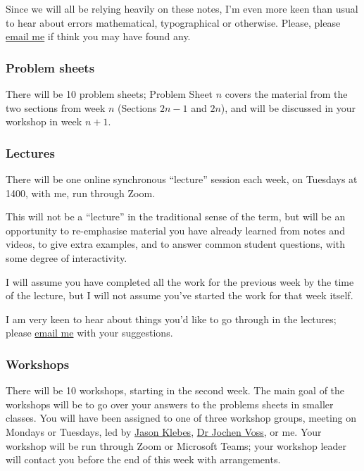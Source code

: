 \documentclass[
  a4paper,
]{article}
\theoremstyle{definition}
\theoremstyle{definition}
\theoremstyle{definition}
\theoremstyle{remark}
\begin{document}
Since we will all be relying heavily on these notes, I'm even more keen than usual to hear about errors mathematical, typographical or otherwise. Please, please \href{mailto:m.aldridge@leeds.ac.uk}{email me} if think you may have found any.

\hypertarget{problem-sheets}{%
\subsubsection*{Problem sheets}\label{problem-sheets}}

There will be 10 problem sheets; Problem Sheet \(n\) covers the material from the two sections from week \(n\) (Sections \(2n -1\) and \(2n\)), and will be discussed in your workshop in week \(n+1\).

\hypertarget{lectures}{%
\subsubsection*{Lectures}\label{lectures}}

There will be one online synchronous ``lecture'' session each week, on Tuesdays at 1400, with me, run through Zoom.

This will not be a ``lecture'' in the traditional sense of the term, but will be an opportunity to re-emphasise material you have already learned from notes and videos, to give extra examples, and to answer common student questions, with some degree of interactivity.

I will assume you have completed all the work for the previous week by the time of the lecture, but I will not assume you've started the work for that week itself.

I am very keen to hear about things you'd like to go through in the lectures; please \href{mailto:m.aldridge@leeds.ac.uk}{email me} with your suggestions.

\hypertarget{workshops}{%
\subsubsection*{Workshops}\label{workshops}}

There will be 10 workshops, starting in the second week. The main goal of the workshops will be to go over your answers to the problems sheets in smaller classes. You will have been assigned to one of three workshop groups, meeting on Mondays or Tuesdays, led by \href{https://eps.leeds.ac.uk/maths/pgr/8790/jason-klebes}{Jason Klebes}, \href{http://www1.maths.leeds.ac.uk/~voss/}{Dr Jochen Voss}, or me. Your workshop will be run through Zoom or Microsoft Teams; your workshop leader will contact you before the end of this week with arrangements.
\end{document}
